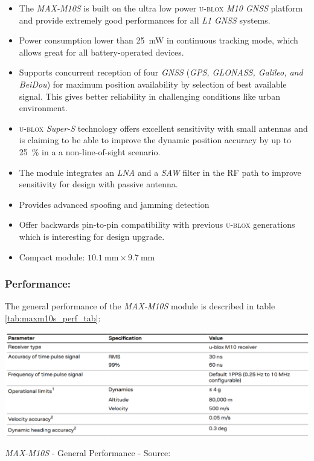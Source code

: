 \documentclass[report.tex]{subfiles}
\begin{document}
\begin{itemize}
\item The \textit{MAX-M10S} is built on the ultra low power \textsc{u-blox} \textit{M10 GNSS} platform and provide extremely good performances for all \textit{L1} \textit{GNSS} systems.
\item Power consumption lower than \SI{25}{\milli\watt} in continuous tracking mode, which allows great for all battery-operated devices.
\item Supports concurrent reception of four \textit{GNSS} (\textit{GPS, GLONASS, Galileo, and BeiDou}) for maximum position availability by selection of best available signal. This gives better reliability in challenging conditions like urban environment.
\item \textsc{u-blox} \textit{Super-S} technology offers excellent sensitivity with small antennas and is claiming to be able to improve the dynamic position accuracy by up to \SI{25}{\percent} in a a non-line-of-sight scenario.
\item The module integrates an \textit{LNA} and a \textit{SAW} filter in the RF path to improve sensitivity for design with passive antenna.
\item Provides advanced spoofing and jamming detection
\item Offer backwards pin-to-pin compatibility with previous \textsc{u-blox} generations which is interesting for design upgrade.
\item Compact module: $\SI{10.1}{\milli\meter} \times \SI{9.7}{\milli\meter}$
\end{itemize}

\subsubsection{Performance:}

The general performance of the \textit{MAX-M10S} module is described in table \ref{tab:maxm10s_perf_tab}:

\begin{table}[H]
	\centering
	\includegraphics[width=1\textwidth]{Include/Figure/comp/maxm10s_perf_tab.png}
\caption{\textit{MAX-M10S} - General Performance - Source: \cite{MAXM10S}}
\label{tab:maxm10s_perf_tab}
\end{table}
\end{document}
